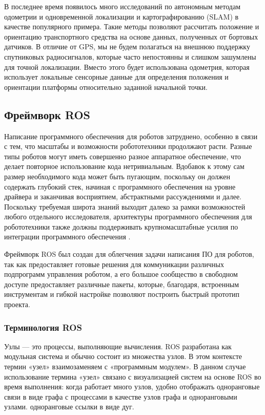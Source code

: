 \documentclass[12pt,a4paper]{scrartcl}
\begin{document}
				В последнее время появилось много исследований по автономным методам одометрии и одновременной локализации и картографированию (SLAM) в качестве популярного примера. Такие методы позволяют рассчитать положение и ориентацию транспортного средства на основе данных, полученных от бортовых датчиков. В отличие от GPS, мы не будем полагаться на внешнюю поддержку спутниковых радиосигналов, которые часто непостоянны и слишком зашумлены для точной локализации. Вместо этого будет использована одометрия, которая использует локальные сенсорные данные для определения положения и ориентации платформы относительно заданной начальной точки\cite{bib:OdometrySLAM}.
			\subsection{Фреймворк ROS}
				Написание программного обеспечения для роботов затруднено, особенно в связи с тем, что масштабы и возможности робототехники продолжают расти. Разные типы роботов могут иметь совершенно разное аппаратное обеспечение, что делает повторное использование кода нетривиальным. Вдобавок к этому сам размер необходимого кода может быть пугающим, поскольку он должен содержать глубокий стек, начиная с программного обеспечения на уровне драйвера и заканчивая восприятием, абстрактными рассуждениями и далее. Поскольку требуемая широта знаний выходит далеко за рамки возможностей любого отдельного исследователя, архитектуры программного обеспечения для робототехники также должны поддерживать крупномасштабные усилия по интеграции программного обеспечения \cite{bib:ROSDescription}.
				
				Фреймворк ROS был создан для облегчения задачи написания ПО для роботов, так как предоставляет готовые решения для коммуникации различных подпрограмм управления роботом, а его большое сообщество в свободном доступе предоставляет различные пакеты, которые, благодаря, встроенным инструментам и гибкой настройке позволяют построить быстрый прототип проекта. 
				
				
				\subsubsection{Терминология ROS}
					Узлы — это процессы, выполняющие вычисления. ROS разработана как модульная система и обычно состоит из множества узлов. В этом контексте термин «узел» взаимозаменяем с «программным модулем». В данном случае использование термина «узел» связано с визуализацией систем на основе ROS во время выполнения: когда работает много узлов, удобно отображать одноранговые связи в виде графа с процессами в качестве узлов графа и одноранговыми узлами. одноранговые ссылки в виде дуг.
					
\end{document}
